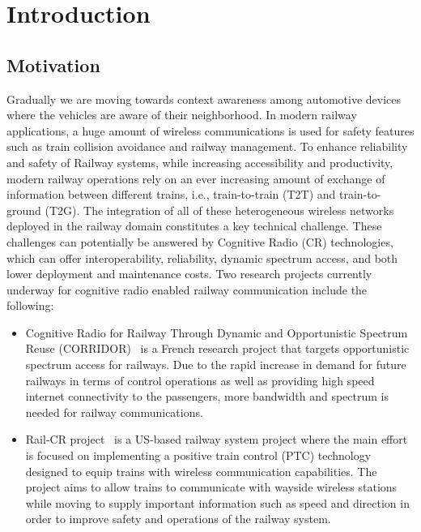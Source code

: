 \chapter{Introduction}
\label{ch:introduction}
\section{Motivation}
Gradually we are moving towards context awareness among automotive devices where the vehicles are aware of their neighborhood. In modern railway applications, a huge amount of wireless communications is used for safety features such as train collision avoidance and railway management. To enhance reliability and safety of Railway systems, while increasing accessibility and productivity, modern railway operations rely on an ever increasing amount of exchange of information between different trains, i.e., train-to-train (T2T) and train-to-ground (T2G). The integration of all of these heterogeneous wireless networks deployed in the railway domain constitutes a key technical challenge. These challenges can potentially be answered by Cognitive Radio (CR) technologies, which can offer interoperability, reliability, dynamic spectrum access, and both lower deployment and maintenance costs. Two research projects currently underway for cognitive radio enabled railway communication include the following:

\begin{itemize}

\item Cognitive Radio for Railway Through Dynamic and Opportunistic Spectrum Reuse (CORRIDOR)~\cite{corridor} is a French research project that targets opportunistic spectrum access for railways. Due to the rapid increase in demand for future railways in terms of control operations as well as providing high speed internet connectivity to the passengers, more bandwidth and spectrum is needed for railway communications.

\item Rail-CR project~\cite{5621621} is a US-based railway system project where the main effort is focused on implementing a positive train control (PTC) technology designed to equip trains with wireless communication capabilities. The project aims to allow trains to communicate with wayside wireless stations while moving to supply important information such as speed and direction in order to improve safety and operations of the railway system.

\end{itemize}

